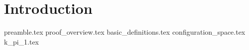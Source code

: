 \documentclass[class=article, crop=false]{standalone}
\begin{document}
\section{Introduction}
{preamble.tex}
{proof_overview.tex}
{basic_definitions.tex}
{configuration_space.tex}
{k_pi_1.tex}
\end{document}
